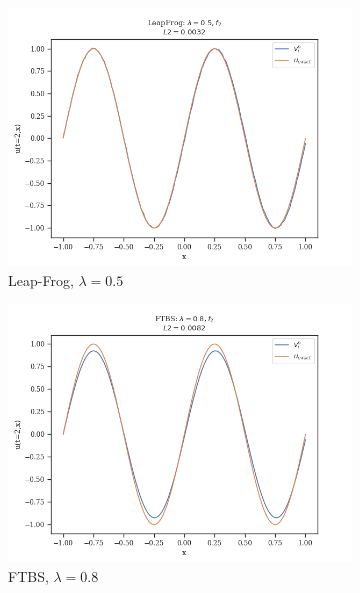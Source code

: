 \begin{figure}
\begin{subfigure}{0.3\linewidth}
        \centering
        \includegraphics[width=\linewidth]{figures/LeapFrog/LeapFrog_lambda=0.5,f2}
        \caption{Leap-Frog, $\lambda =0.5$}
    \end{subfigure}
    \hfill
    \vspace{1cm}
    \begin{subfigure}{0.3\linewidth}
        \centering
        \includegraphics[width=\linewidth]{figures/FTBS/FTBS_lambda=0.8,f2}
        \caption{FTBS, $\lambda = 0.8$}
    \end{subfigure}
    \hfill
    \begin{subfigure}{0.3\linewidth}
        \centering

\end{subfigure}
\end{figure}
